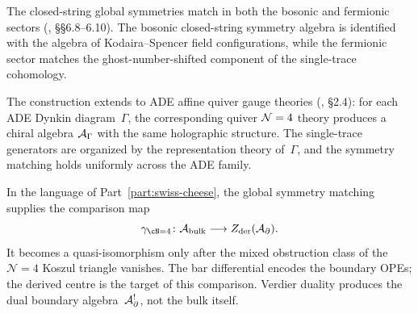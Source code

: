 \begin{proposition}
The closed-string global symmetries match in both the bosonic and
fermionic sectors \textup{(}\!\cite{CG18}, \S\S6.8--6.10\textup{)}.
The bosonic closed-string symmetry algebra is identified with the
algebra of Kodaira--Spencer field configurations, while the fermionic
sector matches the ghost-number-shifted component of the single-trace
cohomology.
\end{proposition}

\begin{remark}
The construction extends to ADE affine quiver gauge theories
\textup{(}\!\cite{CG18}, \S2.4\textup{)}: for each ADE Dynkin
diagram~$\Gamma$, the corresponding quiver $\mathcal N=4$ theory produces a
chiral algebra $\mathcal A_\Gamma$ with the same holographic structure. The
single-trace generators are organized by the representation theory
of~$\Gamma$, and the symmetry matching holds uniformly across the
ADE family.
\end{remark}

\begin{remark}
In the language of Part~\ref{part:swiss-cheese}, the global symmetry
matching supplies the comparison map
\begin{equation}%
\gamma_{\cN=4}\colon
\A_{\mathrm{bulk}} \longrightarrow Z_{\mathrm{der}}(\A_{\partial}).
\end{equation}
It becomes a quasi-isomorphism only after the mixed obstruction class
of the $\mathcal N=4$ Koszul triangle vanishes. The bar differential
encodes the boundary OPEs; the derived centre is the target of this
comparison. Verdier duality produces the dual boundary
algebra~$\mathcal A_\partial^!$, not the bulk itself.
\end{remark}

